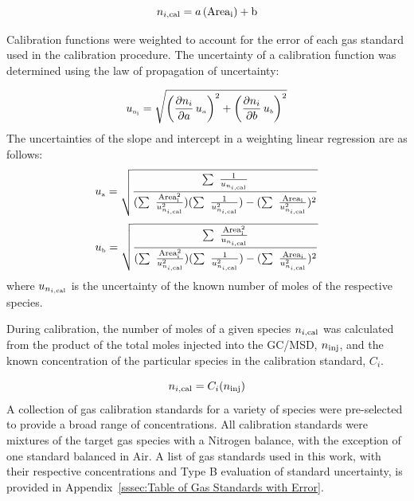 \documentclass[12pt]{article}
\begin{document}
\begin{equation}
\label{eq:Calibration Curve}
n_{i,\rm cal} = a \, (\rm {Area}_{i})+b
\end{equation}

Calibration functions were weighted to account for the error of each gas standard used in the calibration procedure. The uncertainty of a calibration function was determined using the law of propagation of uncertainty:

\begin{equation}
\label{eq:Given_Moles_Uncertainty}
 u_{\rm \scriptscriptstyle n_{i}} = \sqrt{{\left( \frac{\partial n_{i}}{\partial a}\,u_{\scriptscriptstyle a} \right)}^2+{\left(\frac{\partial {n_{i}}}{\partial b}\,u_{\scriptscriptstyle b}\right)}^2}
\end{equation}
The uncertainties of the slope and intercept in a weighting linear regression are as follows:
\begin{equation}
\label{eq:Slope_Uncertainty}
u_{\rm \scriptscriptstyle a} =\sqrt{\frac{\sum~\frac{1}{u_{n_{i,\rm cal}}}}{(\sum~\frac{\rm{Area}_{i}^2}{{u_{n_{i,\rm cal}}^2}})(\sum~\frac{1}{{u_{n_{i,\rm cal}}^2}})-(\sum~\frac{\rm{Area}_{i}}{{u_{n_{i,\rm cal}}^2}})^2}}
\end{equation}
\begin{equation}
\label{eq:Intercept_Uncertainty}
u_{\rm \scriptscriptstyle b} =\sqrt{\frac{\sum~\frac{\rm{Area}_{i}^2}{u_{n_{i,\rm cal}}}}{(\sum~\frac{\rm{Area}_{i}^2}{{u_{n_{i,\rm cal}}^2}})(\sum~\frac{1}{{u_{n_{i,\rm cal}}^2}})-(\sum~\frac{\rm{Area}_{i}}{{u_{n_{i,\rm cal}}^2}})^2}}
\end{equation}
where $u_{n_{i,\rm cal}}$ is the uncertainty of the known number of moles of the respective species.

During calibration, the number of moles of a given species $n_{i,\rm cal}$ was calculated from the product of the total moles injected into the GC/MSD, $n_{\rm inj}$, and the known concentration of the particular species in the calibration standard, $C_{i}$.

\begin{equation}
\label{eq:Cal_Moles}
n_{i,\rm cal} = C_{i}(n_{\rm inj})
\end{equation}
A collection of gas calibration standards for a variety of species were pre-selected to provide a broad range of concentrations. All calibration standards were mixtures of the target gas species with a Nitrogen balance, with the exception of one standard balanced in Air. A list of gas standards used in this work, with their respective concentrations and Type B evaluation of standard uncertainty, is provided in Appendix~\ref{sssec:Table of Gas Standards with Error}.
\end{document}
